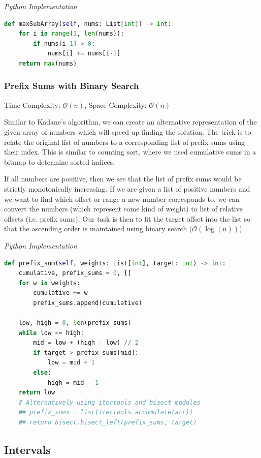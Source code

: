 \documentclass{article}
\newcommand{\bigO}{\mathcal{O}}
\begin{document}
\vspace{8pt} \emph{Python Implementation}
\begin{lstlisting}[language=Python]
def maxSubArray(self, nums: List[int]) -> int:
    for i in range(1, len(nums)):
        if nums[i-1] > 0:
            nums[i] += nums[i-1]
    return max(nums)
\end{lstlisting}

    \subsubsection{Prefix Sums with Binary Search}
    Time Complexity: $\bigO(n)$, Space Complexity: $\bigO(n)$
    
    Similar to Kadane's algorithm, we can create an alternative representation of the given array of numbers which will speed up finding the solution. The trick is to relate the original list of numbers to a corresponding list of prefix sums using their index. This is similar to counting sort, where we used cumulative sums in a bitmap to determine sorted indices.
    
    If all numbers are positive, then we see that the list of prefix sums would be strictly monotonically increasing. If we are given a list of positive numbers and we want to find which offset or range a new number corresponds to, we can convert the numbers (which represent some kind of weight) to list of relative offsets (i.e. prefix sums). Our task is then to fit the target offset into the list so that the ascending order is maintained using binary search ($\bigO(\log(n))$).

\vspace{8pt} \emph{Python Implementation}
\begin{lstlisting}[language=Python]
def prefix_sum(self, weights: List[int], target: int) -> int:
    cumulative, prefix_sums = 0, []
    for w in weights:
        cumulative += w
        prefix_sums.append(cumulative)

    low, high = 0, len(prefix_sums)
    while low <= high:
        mid = low + (high - low) // 2
        if target > prefix_sums[mid]:
            low = mid + 1
        else:
            high = mid - 1
    return low
    # Alternatively using itertools and bisect modules
    ## prefix_sums = list(itertools.accumulate(arr)) 
    ## return bisect.bisect_left(prefix_sums, target)
\end{lstlisting}

\subsection{Intervals}
\end{document}
